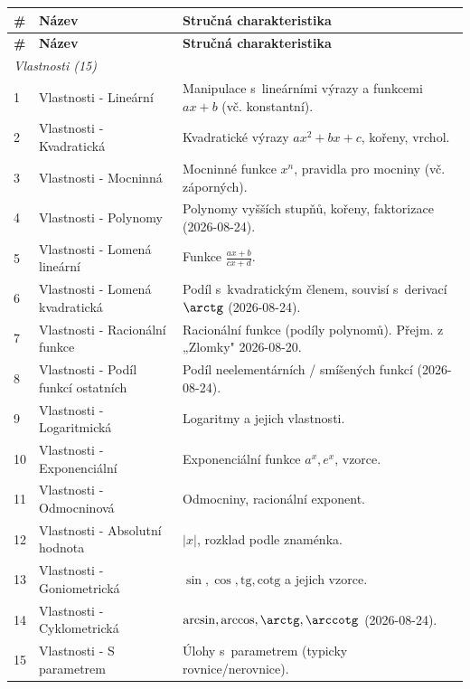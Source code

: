 \documentclass[11pt,a4paper]{article}
\begin{document}
\begin{longtable}{p{1cm}p{6cm}p{8.5cm}}
  \toprule
  \textbf{\#} & \textbf{Název} & \textbf{Stručná charakteristika} \\
  \midrule
  \endfirsthead
  \toprule
  \textbf{\#} & \textbf{Název} & \textbf{Stručná charakteristika} \\
  \midrule
  \endhead

  \multicolumn{3}{l}{\textit{Vlastnosti (15)}} \\[2pt]
   1 & Vlastnosti - Lineární                   & Manipulace s~lineárními výrazy a funkcemi $ax + b$ (vč. konstantní). \\
   2 & Vlastnosti - Kvadratická                & Kvadratické výrazy $ax^2+bx+c$, kořeny, vrchol. \\
   3 & Vlastnosti - Mocninná                   & Mocninné funkce $x^n$, pravidla pro mocniny (vč. záporných). \\
   4 & Vlastnosti - Polynomy                   & Polynomy vyšších stupňů, kořeny, faktorizace (2026-08-24). \\
   5 & Vlastnosti - Lomená lineární            & Funkce $\frac{ax+b}{cx+d}$. \\
   6 & Vlastnosti - Lomená kvadratická         & Podíl s~kvadratickým členem, souvisí s~derivací $\arctg$ (2026-08-24). \\
   7 & Vlastnosti - Racionální funkce          & Racionální funkce (podíly polynomů). Přejm. z „Zlomky" 2026-08-20. \\
   8 & Vlastnosti - Podíl funkcí ostatních     & Podíl neelementárních / smíšených funkcí (2026-08-24). \\
   9 & Vlastnosti - Logaritmická               & Logaritmy a jejich vlastnosti. \\
  10 & Vlastnosti - Exponenciální              & Exponenciální funkce $a^x, e^x$, vzorce. \\
  11 & Vlastnosti - Odmocninová                & Odmocniny, racionální exponent. \\
  12 & Vlastnosti - Absolutní hodnota          & $|x|$, rozklad podle znaménka. \\
  13 & Vlastnosti - Goniometrická              & $\sin, \cos, \mathrm{tg}, \mathrm{cotg}$ a jejich vzorce. \\
  14 & Vlastnosti - Cyklometrická              & $\arcsin, \arccos, \arctg, \arccotg$ (2026-08-24). \\
  15 & Vlastnosti - S parametrem               & Úlohy s~parametrem (typicky rovnice/nerovnice). \\[4pt]


\end{longtable}
\end{document}
